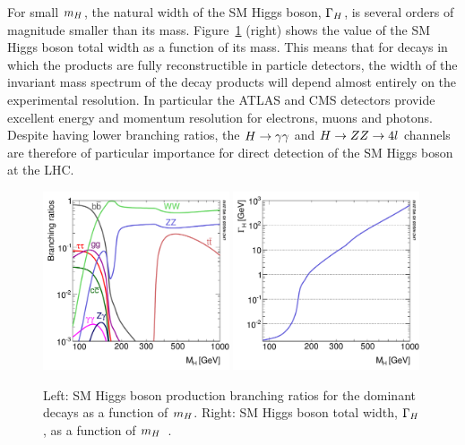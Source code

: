 For small $m_{H}$, the natural width of the SM Higgs boson, $\Gamma_{H}$, is several
orders of magnitude smaller than its mass. Figure~\ref{fig:higgsdecay} (right) shows the 
value of the SM Higgs boson total width as a function of its mass.
This means that for decays in which the products are fully reconstructible in particle
detectors, the width of the invariant mass spectrum of the decay products will depend almost entirely
on the experimental resolution. 
In particular the ATLAS and CMS detectors provide excellent energy and momentum resolution 
for electrons, muons and photons.
Despite having lower branching ratios,  the $H\rightarrow\gamma\gamma$ and $H\rightarrow ZZ \rightarrow 4l$ channels
are therefore of particular importance for direct detection of the SM Higgs boson
at the LHC.


\begin{figure}[hbtp]
\begin{center}
\includegraphics[width=0.49\textwidth]{theory/pheno/YRHXS_BR_fig3.pdf}
\includegraphics[width=0.49\textwidth]{theory/pheno/YRHXS_BR_fig2.pdf}
\caption{Left: SM Higgs boson production branching ratios for 
the dominant decays as a function of $m_{H}$. Right: SM Higgs boson total width, $\Gamma_{H}$, as 
a function of $m_{H}$~\citep{lhcxswg2011}.}
\label{fig:higgsdecay}
\end{center}
\end{figure}

